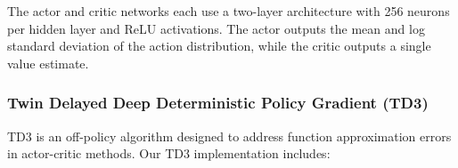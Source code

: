 \documentclass[12pt]{article}
\begin{document}

The actor and critic networks each use a two-layer architecture with 256 neurons per hidden layer and ReLU activations. The actor outputs the mean and log standard deviation of the action distribution, while the critic outputs a single value estimate.


\subsubsection{Twin Delayed Deep Deterministic Policy Gradient (TD3)}

TD3 is an off-policy algorithm designed to address function approximation errors in actor-critic methods. Our TD3 implementation includes:

\end{document}
